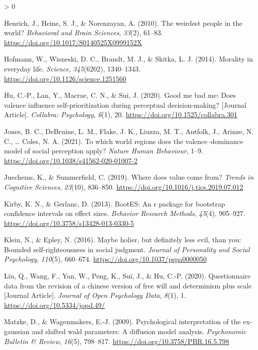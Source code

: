 \documentclass[
  english,
  man]{apa6}
\newlength{\cslhangindent}
\newenvironment{CSLReferences}[2] %
 {%
  \setlength{\parindent}{0pt}
  \ifodd #1 \everypar{\setlength{\hangindent}{\cslhangindent}}\ignorespaces\fi
  \ifnum #2 > 0
  \setlength{\parskip}{#2\baselineskip}
  \fi
 }%
 {}
\begin{document}
\begin{CSLReferences}{1}{0}
\leavevmode\hypertarget{ref-henrich_weirdest_2010}{}%
Henrich, J., Heine, S. J., \& Norenzayan, A. (2010). The weirdest people in the world? \emph{Behavioral and Brain Sciences}, \emph{33}(2), 61--83. \url{https://doi.org/10.1017/S0140525X0999152X}

\leavevmode\hypertarget{ref-hofmann_morality_2014}{}%
Hofmann, W., Wisneski, D. C., Brandt, M. J., \& Skitka, L. J. (2014). Morality in everyday life. \emph{Science}, \emph{345}(6202), 1340--1343. \url{https://doi.org/10.1126/science.1251560}

\leavevmode\hypertarget{ref-Hu_2020_GoodSelf}{}%
Hu, C.-P., Lan, Y., Macrae, C. N., \& Sui, J. (2020). Good me bad me: Does valence influence self-prioritization during perceptual decision-making? {[}Journal Article{]}. \emph{Collabra: Psychology}, \emph{6}(1), 20. \url{https://doi.org/10.1525/collabra.301}

\leavevmode\hypertarget{ref-jones_which_2021}{}%
Jones, B. C., DeBruine, L. M., Flake, J. K., Liuzza, M. T., Antfolk, J., Arinze, N. C., \ldots{} Coles, N. A. (2021). To which world regions does the valence--dominance model of social perception apply? \emph{Nature Human Behaviour}, 1--9. \url{https://doi.org/10.1038/s41562-020-01007-2}

\leavevmode\hypertarget{ref-juechems_where_2019}{}%
Juechems, K., \& Summerfield, C. (2019). Where does value come from? \emph{Trends in Cognitive Sciences}, \emph{23}(10), 836--850. \url{https://doi.org/10.1016/j.tics.2019.07.012}

\leavevmode\hypertarget{ref-kirby_bootes_2013}{}%
Kirby, K. N., \& Gerlanc, D. (2013). {BootES}: An r package for bootstrap confidence intervals on effect sizes. \emph{Behavior Research Methods}, \emph{45}(4), 905--927. \url{https://doi.org/10.3758/s13428-013-0330-5}

\leavevmode\hypertarget{ref-klein_maybe_2016}{}%
Klein, N., \& Epley, N. (2016). Maybe holier, but definitely less evil, than you: Bounded self-righteousness in social judgment. \emph{Journal of Personality and Social Psychology}, \emph{110}(5), 660--674. \url{https://doi.org/10.1037/pspa0000050}

\leavevmode\hypertarget{ref-Liu_2020_JOPD}{}%
Liu, Q., Wang, F., Yan, W., Peng, K., Sui, J., \& Hu, C.-P. (2020). Questionnaire data from the revision of a chinese version of free will and determinism plus scale {[}Journal Article{]}. \emph{Journal of Open Psychology Data}, \emph{8}(1), 1. \url{https://doi.org/10.5334/jopd.49/}

\leavevmode\hypertarget{ref-matzke_psychological_2009}{}%
Matzke, D., \& Wagenmakers, E.-J. (2009). Psychological interpretation of the ex-gaussian and shifted wald parameters: A diffusion model analysis. \emph{Psychonomic Bulletin \& Review}, \emph{16}(5), 798--817. \url{https://doi.org/10.3758/PBR.16.5.798}


\end{CSLReferences}
\end{document}
